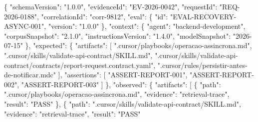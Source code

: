 \documentclass[
  10pt,
  a4paper,
  oneside]{book}
\newenvironment{Shaded}{}{}
\newcommand{\DataTypeTok}[1]{\textcolor[rgb]{0.56,0.13,0.00}{#1}}
\newcommand{\FunctionTok}[1]{\textcolor[rgb]{0.02,0.16,0.49}{#1}}
\newcommand{\OtherTok}[1]{\textcolor[rgb]{0.00,0.44,0.13}{#1}}
\newcommand{\StringTok}[1]{\textcolor[rgb]{0.25,0.44,0.63}{#1}}
\renewenvironment{Shaded}{\begin{snugshade}}{\end{snugshade}}%
\begin{document}
\begin{Shaded}
\begin{Highlighting}[]
\FunctionTok{\{}
  \DataTypeTok{"schemaVersion"}\FunctionTok{:} \StringTok{"1.0.0"}\FunctionTok{,}
  \DataTypeTok{"evidenceId"}\FunctionTok{:} \StringTok{"EV{-}2026{-}0042"}\FunctionTok{,}
  \DataTypeTok{"requestId"}\FunctionTok{:} \StringTok{"REQ{-}2026{-}0188"}\FunctionTok{,}
  \DataTypeTok{"correlationId"}\FunctionTok{:} \StringTok{"corr{-}9812"}\FunctionTok{,}
  \DataTypeTok{"eval"}\FunctionTok{:} \FunctionTok{\{}
    \DataTypeTok{"id"}\FunctionTok{:} \StringTok{"EVAL{-}RECOVERY{-}ASYNC{-}001"}\FunctionTok{,}
    \DataTypeTok{"version"}\FunctionTok{:} \StringTok{"1.0.0"}
  \FunctionTok{\},}
  \DataTypeTok{"context"}\FunctionTok{:} \FunctionTok{\{}
    \DataTypeTok{"agent"}\FunctionTok{:} \StringTok{"backend{-}development"}\FunctionTok{,}
    \DataTypeTok{"corpusSnapshot"}\FunctionTok{:} \StringTok{"2.1.0"}\FunctionTok{,}
    \DataTypeTok{"instructionsVersion"}\FunctionTok{:} \StringTok{"1.4.0"}\FunctionTok{,}
    \DataTypeTok{"modelSnapshot"}\FunctionTok{:} \StringTok{"2026{-}07{-}15"}
  \FunctionTok{\},}
  \DataTypeTok{"expected"}\FunctionTok{:} \FunctionTok{\{}
    \DataTypeTok{"artifacts"}\FunctionTok{:} \OtherTok{[}
      \StringTok{".cursor/playbooks/operacao{-}assincrona.md"}\OtherTok{,}
      \StringTok{".cursor/skills/validate{-}api{-}contract/SKILL.md"}\OtherTok{,}
      \StringTok{".cursor/skills/validate{-}api{-}contract/contracts/report{-}request.contract.yaml"}\OtherTok{,}
      \StringTok{".cursor/rules/persistir{-}antes{-}de{-}notificar.mdc"}
    \OtherTok{]}\FunctionTok{,}
    \DataTypeTok{"assertions"}\FunctionTok{:} \OtherTok{[}
      \StringTok{"ASSERT{-}REPORT{-}001"}\OtherTok{,}
      \StringTok{"ASSERT{-}REPORT{-}002"}\OtherTok{,}
      \StringTok{"ASSERT{-}REPORT{-}003"}
    \OtherTok{]}
  \FunctionTok{\},}
  \DataTypeTok{"observed"}\FunctionTok{:} \FunctionTok{\{}
    \DataTypeTok{"artifacts"}\FunctionTok{:} \OtherTok{[}
      \FunctionTok{\{}
        \DataTypeTok{"path"}\FunctionTok{:} \StringTok{".cursor/playbooks/operacao{-}assincrona.md"}\FunctionTok{,}
        \DataTypeTok{"evidence"}\FunctionTok{:} \StringTok{"retrieval{-}trace"}\FunctionTok{,}
        \DataTypeTok{"result"}\FunctionTok{:} \StringTok{"PASS"}
      \FunctionTok{\}}\OtherTok{,}
      \FunctionTok{\{}
        \DataTypeTok{"path"}\FunctionTok{:} \StringTok{".cursor/skills/validate{-}api{-}contract/SKILL.md"}\FunctionTok{,}
        \DataTypeTok{"evidence"}\FunctionTok{:} \StringTok{"retrieval{-}trace"}\FunctionTok{,}
        \DataTypeTok{"result"}\FunctionTok{:} \StringTok{"PASS"}

\end{Highlighting}
\end{Shaded}
\end{document}
